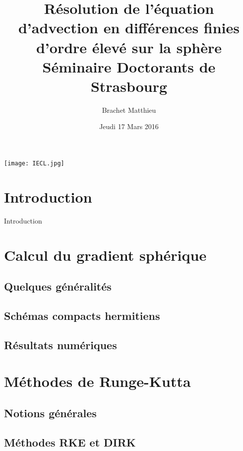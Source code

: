 \documentclass[11pt]{beamer}
\title[\'Equation d'advection sur la sphère]{Résolution de l'équation d'advection en différences finies d'ordre élevé sur la sphère\\
Séminaire Doctorants de Strasbourg}
\author{Brachet Matthieu}
\date[17.03.2017]{Jeudi 17 Mars 2016}
\institute[IECL]{Institut Elie Cartan de Lorraine}
\begin{document}
\begin{frame}
\titlepage
\begin{center}
\texttt{[image: IECL.jpg]}
\end{center}
\end{frame}

\begin{frame}
\tableofcontents
\end{frame}

\section{Introduction}
\begin{frame}{Introduction}

\end{frame}

\section{Calcul du gradient sphérique}

\subsection{Quelques généralités}

\subsection{Schémas compacts hermitiens}

\subsection{Résultats numériques}

\section{Méthodes de Runge-Kutta}

\subsection{Notions générales}

\subsection{Méthodes RKE et DIRK}
\end{document}
